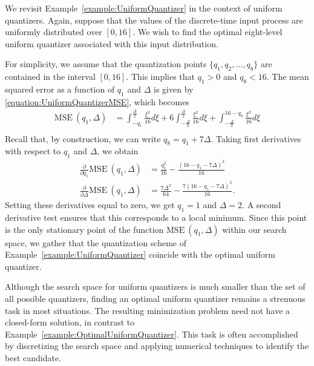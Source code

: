 \begin{example} \label{example:OptimalUniformQuantizer}
We revisit Example~\ref{example:UniformQuantizer} in the context of uniform quantizers.
Again, suppose that the values of the discrete-time input process are uniformly distributed over $[0, 16]$.
We wish to find the optimal eight-level uniform quantizer associated with this input distribution.

For simplicity, we assume that the quantization points $\{ q_1, q_2, \ldots, q_8 \}$ are contained in the interval $[0, 16]$.
This implies that $q_1 > 0$ and $q_8 < 16$.
The mean squared error as a function of $q_1$ and $\Delta$ is given by \eqref{equation:UniformQuantizerMSE}, which becomes
\begin{equation*}
\begin{split}
\text{MSE}~(q_1, \Delta)
&= \int_{-q_1}^{\frac{\Delta}{2}} \frac{\xi^2}{16} d\xi
+ 6 \int_{- \frac{\Delta}{2}}^{\frac{\Delta}{2}} \frac{\xi^2}{16} d\xi
+ \int_{- \frac{\Delta}{2}}^{16 - q_8} \frac{\xi^2}{16} d\xi \\
\end{split}
\end{equation*}
Recall that, by construction, we can write $q_8 = q_1 + 7 \Delta$.
Taking first derivatives with respect to $q_1$ and $\Delta$, we obtain
\begin{align*}
\frac{\partial}{\partial q_1} \text{MSE}~(q_1, \Delta)
&= \frac{q_1^2}{16} - \frac{(16 - q_1 - 7 \Delta)^2}{16} \\
\frac{\partial}{\partial \Delta} \text{MSE}~(q_1, \Delta)
&= \frac{7 \Delta^2}{64} - \frac{7 (16 - q_1 - 7\Delta)^2}{16} .
\end{align*}
Setting these derivatives equal to zero, we get $q_1 = 1$ and $\Delta = 2$.
A second derivative test ensures that this corresponds to a local minimum.
Since this point is the only stationary point of the function $\text{MSE}~(q_1, \Delta)$ within our search space, we gather that the quantization scheme of Example~\ref{example:UniformQuantizer} coincide with the optimal uniform quantizer.
\end{example}

Although the search space for uniform quantizers is much smaller than the set of all possible quantizers, finding an optimal uniform quantizer remains a strenuous task in most situations.
The resulting minimization problem need not have a closed-form solution, in contrast to Example~\ref{example:OptimalUniformQuantizer}.
This task is often accomplished by discretizing the search space and applying numerical techniques to identify the best candidate.


